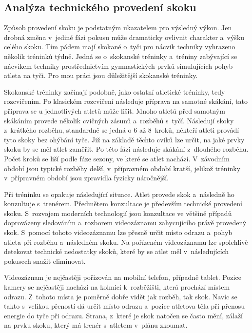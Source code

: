 \subsection{Analýza technického provedení skoku}

Způsob provedení skoku je podstatným ukazatelem pro výsledný výkon. Jen drobná změna v~jediné fázi pokusu může dramaticky ovlivnit charakter a~výšku celého skoku. Tím pádem mají skokané o~tyči pro nácvik techniky vyhrazeno několik tréninků týdně. Jedná se o~skokanské tréninky a~tréniny zabývající se nácvikem techniky prostřednictvím gymnastických prvků simulujících pohyb atleta na tyči. Pro mou práci jsou důležitější skokanské tréninky.

Skokanské tréninky začínají podobně, jako ostatní atletické tréninky, tedy rozcvičením. Po klasickém rozcvičení následuje příprava na samotné skákání, tato příprava se u jednotlivých atletů může lišit. Mnoho atletů před samotným skákáním provede několik cvičných zásunů a~rozběhů s~tyčí. Následují skoky z~krátkého rozběhu, standardně se jedná o 6 až 8~kroků, někteří atleti provádí tyto skoky bez ohýbání tyče. Již na základě těchto cviků lze určit, na jaké prvky skoku by se měl atlet zaměřit. Po této fázi následuje skákání z~dlouhého rozběhu. Počet kroků se liší podle fáze sezony, ve které se atlet nachází. V~závodním období jsou typické rozběhy delší, v~přípravném období kratší, jelikož tréninky v~přípravném období jsou zpravidla fyzicky náročnější.

Při tréninku se opakuje následující situace. Atlet provede skok a~následně ho konzultuje s~trenérem. Předmětem konzultace je především technické provedení skoku. S~rozvojem moderních technologií jsou konzultace ve většině případů doprovázeny sledováním a~rozborem videozáznamu zahycujícího právě provedený skok. S~pomocí tohoto videozáznamu lze přesně určit místo odrazu a~pohyb atleta při rozběhu a~následném skoku. Na pořízeném videozáznamu lze spolehlivě detekovat technické nedostatky skoků, které by se atlet měl v~následujících pokusech snažit eliminovat.

Videozáznam je nejčastěji pořizován na mobilní telefon, případně tablet. Pozice kamery se nejčastěji nachází na kolmici k~rozběžišti, která prochází místem odrazu. Z~tohoto místa je poměrně dobře vidět jak rozběh, tak skok. Navíc se takto s~velikou přeností dá určit místo odrazu a~pozice atletova těla při přenosu energie do tyče při odrazu. Strana, z~které je skok natočen se často mění, zálaží na prvku skoku, který má trenér s~atletem v~plánu zkoumat.

